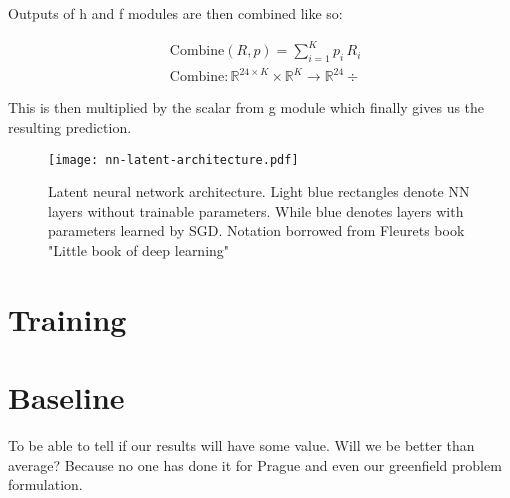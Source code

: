 \vspace{5mm}

\newpage

Outputs of h and f modules are then combined like so:

\begin{equation}
    \begin{split}
         & \text{Combine}(R,p) = \sum_{i=1}^K p_i \, R_i                                             \\
         & \text{Combine}: \mathbb{R}^{24 \times K} \times \mathbb{R}^K \rightarrow \mathbb{R}^{24}÷
    \end{split}
\end{equation}

This is then multiplied by the scalar from g module which finally gives us the resulting prediction.

\begin{figure}[hb]
    \texttt{[image: nn-latent-architecture.pdf]}
    \caption[Latent Neural Network Architecture]{Latent neural network architecture. Light blue rectangles denote NN layers without trainable parameters. While blue denotes layers with parameters learned by SGD. Notation borrowed from Fleurets book "Little book of deep learning"}
    \label{fig:nn-latent}
\end{figure}

\newpage



\section{Training}


\section{Baseline}

To be able to tell if our results will have some value.
Will we be better than average? Because no one has done it for Prague and even our greenfield problem formulation.